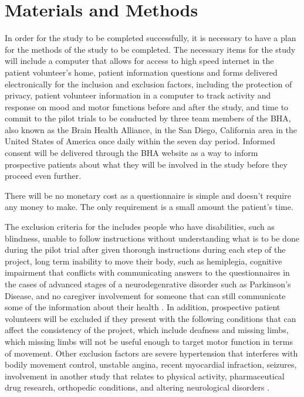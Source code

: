 \documentclass[12pt,letterpaper]{article}
\begin{document}
\section{Materials and Methods}
 In order for the study to be completed successfully, it is necessary to have a plan for the methods of the study to be completed. The necessary items for the study will include a computer that allows for access to high speed internet in the patient volunteer's home, patient information questions and forms delivered electronically for the inclusion and exclusion factors, including the protection of privacy, patient volunteer information in a computer to track activity and response on mood and motor functions before and after the study, and time to commit to the pilot trials to be conducted by three team members of the BHA, also known as the Brain Health Alliance, in the San Diego, California area in the United States of America once daily within the seven day period. Informed consent will be delivered through the BHA website as a way to inform prospective patients about what they will be involved in the study before they proceed even further. 
 
There will be no monetary cost as a questionnaire is simple and doesn't require any money to make. The only requirement is a small amount the patient's time.
 
 The exclusion criteria for the  includes people who have disabilities, such as blindness, unable to follow instructions without understanding what is to be done during the pilot trial after given thorough instructions during each step of the project, long term inability to move their body, such as hemiplegia, cognitive impairment that conflicts with communicating answers to the questionnaires in the cases of advanced stages of a neurodegenrative disorder such as Parkinson's Disease, and no caregiver involvement for someone that can still communicate some of the information about their health \cite{Martinez-Martin2007}. In addition, prospective patient volunteers will be excluded if they present with the following conditions that can affect the consistency of the project, which include deafness and missing limbs, which missing limbs will not be useful enough to target motor function in terms of movement. Other exclusion factors are severe hypertension that interferes with bodily movement control, unstable angina, recent myocardial infraction, seizures, involvement in another study that relates to physical activity,  pharmaceutical drug research, orthopedic conditions, and altering neurological disorders \cite{Pompeua2014}.
 
\end{document}
